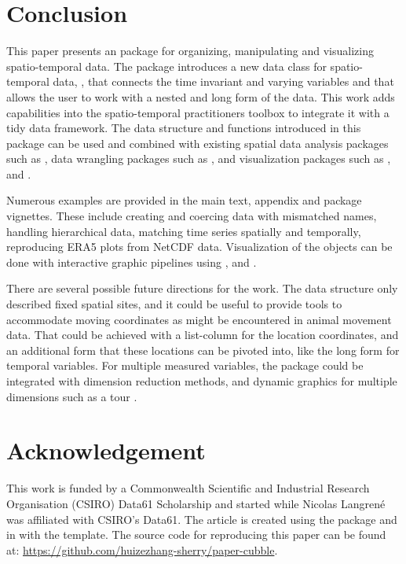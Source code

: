 \documentclass[
]{jss}
\begin{document}
\hypertarget{conclude}{%
\section{Conclusion}\label{conclude}}

This paper presents an  package  for organizing,
manipulating and visualizing spatio-temporal data. The package
introduces a new data class for spatio-temporal data, ,
that connects the time invariant and varying variables and that allows
the user to work with a nested and long form of the data. This work adds
capabilities into the spatio-temporal practitioners toolbox to integrate
it with a tidy data framework. The data structure and functions
introduced in this package can be used and combined with existing
spatial data analysis packages such as , data wrangling packages
such as , and visualization packages such as ,
 and .

Numerous examples are provided in the main text, appendix and package
vignettes. These include creating and coercing data with mismatched
names, handling hierarchical data, matching time series spatially and
temporally, reproducing ERA5 plots from NetCDF data. Visualization of
the  objects can be done with interactive graphic pipelines
using ,  and .

There are several possible future directions for the work. The data
structure only described fixed spatial sites, and it could be useful to
provide tools to accommodate moving coordinates as might be encountered
in animal movement data. That could be achieved with a list-column for
the location coordinates, and an additional form that these locations
can be pivoted into, like the long form for temporal variables. For
multiple measured variables, the  package could be
integrated with dimension reduction methods, and dynamic graphics for
multiple dimensions such as a tour \citep{wickham_tourr_2011}.

\hypertarget{acknowledgement}{%
\section{Acknowledgement}\label{acknowledgement}}

This work is funded by a Commonwealth Scientific and Industrial Research
Organisation (CSIRO) Data61 Scholarship and started while Nicolas
Langrené was affiliated with CSIRO's Data61. The article is created
using the package  \citep{knitr} and 
\citep{rmarkdown} in  with the 
template. The source code for reproducing this paper can be found at:
\url{https://github.com/huizezhang-sherry/paper-cubble}.


\end{document}
